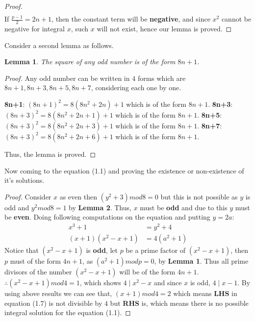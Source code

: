 \documentclass{article}
\newtheorem{lemma}{Lemma}
\newenvironment{myenv}{\begin{adjustwidth}{1cm}{}}{\end{adjustwidth}}
\begin{document}
{{\begin{proof}
\begin{align*}
    \end{align*}
    If $\frac{p-1}{2}=2n+1$, then the constant term will be \textbf{negative}, and since $x^2$ cannot be negative for integral $x$, such $x$ will not exist, hence our lemma is proved.
  \end{proof}
  Consider a second lemma as follows.
  \begin{lemma}
    The square of any odd number is of the form $8n+1$.
  \end{lemma}
  \begin{proof}
    Any odd number can be written in $4$ forms which are $8n+1,8n+3,8n+5,8n+7$, considering each one by one. \newline
    \begin{myenv}
      \textbf{8n+1}: $(8n+1)^2=8(8n^2+2n)+1$ which is of the form $8n+1$. \newline
      \textbf{8n+3}: $(8n+3)^2=8(8n^2+2n+1)+1$ which is of the form $8n+1$. \newline
      \textbf{8n+5}: $(8n+3)^2=8(8n^2+2n+3)+1$ which is of the form $8n+1$. \newline
      \textbf{8n+7}: $(8n+3)^2=8(8n^2+2n+6)+1$ which is of the form $8n+1$. \newline
    \end{myenv}
    Thus, the lemma is proved.
  \end{proof}
    Now coming to the equation (1.1) and proving the existence or non-existence of it's solutions.
    \begin{proof}
      Consider $x$ as even then $(y^2+3)mod8=0$ but this is not possible as $y$ is odd and $y^2mod8=1$ by \textbf{Lemma 2}. \newline
      Thus, $x$ must be \textbf{odd} and due to this $y$ must be \textbf{even}. \newline
      Doing following computations on the equation and putting $y=2a$:
      \begin{align}
        x^3+1&=y^2+4 \label{eq:6} \\
        (x+1)(x^2-x+1)&=4(a^2+1)
      \end{align}
      Notice that $(x^2-x+1)$ is \textbf{odd}, let $p$ be a prime factor of $(x^2-x+1)$, then $p$ must of the form $4n+1$, as $(a^2+1)modp=0$, by \textbf{Lemma 1}. \newline
      Thus all prime divisors of the number $(x^2-x+1)$ will be of the form $4n+1$. \newline
      $\therefore (x^2-x+1)mod4=1$, which shows $4 \mid x^2-x$ and since $x$ is odd, $4 \mid x-1$. \newline
      By using above results we can see that, $(x+1)mod4=2$ which means \textbf{LHS} in equation (1.7) is not divisible by $4$ but \textbf{RHS} is, which means there is no possible integral solution for the equation (1.1).
    \end{proof}
  }
}
\end{document}
